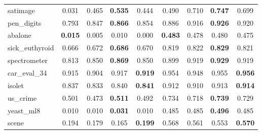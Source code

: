 \begin{figure}[ht]
\begin{tabular}{p{22mm}|*4{p{14mm}}|*4{p{14mm}}}
        satimage&\multicolumn{1}{c}{0.031}&\multicolumn{1}{c}{0.465}&\multicolumn{1}{c}{\textbf{0.535}}&\multicolumn{1}{c|}{0.444}&\multicolumn{1}{c}{0.490}&\multicolumn{1}{c}{0.710}&\multicolumn{1}{c}{\textbf{0.747}}&\multicolumn{1}{c}{0.699}\\
        pen\_digits&\multicolumn{1}{c}{0.793}&\multicolumn{1}{c}{0.847}&\multicolumn{1}{c}{\textbf{0.866}}&\multicolumn{1}{c|}{0.854}&\multicolumn{1}{c}{0.886}&\multicolumn{1}{c}{0.916}&\multicolumn{1}{c}{\textbf{0.926}}&\multicolumn{1}{c}{0.920}\\
        abalone&\multicolumn{1}{c}{\textbf{0.015}}&\multicolumn{1}{c}{0.005}&\multicolumn{1}{c}{0.010}&\multicolumn{1}{c|}{0.000}&\multicolumn{1}{c}{\textbf{0.483}}&\multicolumn{1}{c}{0.478}&\multicolumn{1}{c}{0.480}&\multicolumn{1}{c}{0.475}\\
        sick\_euthyroid&\multicolumn{1}{c}{0.666}&\multicolumn{1}{c}{0.672}&\multicolumn{1}{c}{\textbf{0.686}}&\multicolumn{1}{c|}{0.670}&\multicolumn{1}{c}{0.819}&\multicolumn{1}{c}{0.822}&\multicolumn{1}{c}{\textbf{0.829}}&\multicolumn{1}{c}{0.821}\\
        spectrometer&\multicolumn{1}{c}{0.813}&\multicolumn{1}{c}{0.850}&\multicolumn{1}{c}{\textbf{0.869}}&\multicolumn{1}{c|}{0.850}&\multicolumn{1}{c}{0.899}&\multicolumn{1}{c}{0.919}&\multicolumn{1}{c}{\textbf{0.929}}&\multicolumn{1}{c}{0.919}\\
        car\_eval\_34&\multicolumn{1}{c}{0.915}&\multicolumn{1}{c}{0.904}&\multicolumn{1}{c}{0.917}&\multicolumn{1}{c|}{\textbf{0.919}}&\multicolumn{1}{c}{0.954}&\multicolumn{1}{c}{0.948}&\multicolumn{1}{c}{0.955}&\multicolumn{1}{c}{\textbf{0.956}}\\
        isolet&\multicolumn{1}{c}{0.837}&\multicolumn{1}{c}{0.833}&\multicolumn{1}{c}{0.840}&\multicolumn{1}{c|}{\textbf{0.841}}&\multicolumn{1}{c}{0.912}&\multicolumn{1}{c}{0.910}&\multicolumn{1}{c}{0.913}&\multicolumn{1}{c}{\textbf{0.914}}\\
        us\_crime&\multicolumn{1}{c}{0.501}&\multicolumn{1}{c}{0.473}&\multicolumn{1}{c}{\textbf{0.511}}&\multicolumn{1}{c|}{0.492}&\multicolumn{1}{c}{0.734}&\multicolumn{1}{c}{0.718}&\multicolumn{1}{c}{\textbf{0.739}}&\multicolumn{1}{c}{0.729}\\
        yeast\_ml8&\multicolumn{1}{c}{0.010}&\multicolumn{1}{c}{0.010}&\multicolumn{1}{c}{\textbf{0.031}}&\multicolumn{1}{c|}{0.010}&\multicolumn{1}{c}{0.485}&\multicolumn{1}{c}{0.485}&\multicolumn{1}{c}{\textbf{0.496}}&\multicolumn{1}{c}{0.485}\\
        scene&\multicolumn{1}{c}{0.194}&\multicolumn{1}{c}{0.179}&\multicolumn{1}{c}{0.165}&\multicolumn{1}{c|}{\textbf{0.199}}&\multicolumn{1}{c}{0.568}&\multicolumn{1}{c}{0.561}&\multicolumn{1}{c}{0.553}&\multicolumn{1}{c}{\textbf{0.570}}\\

\end{tabular}
\end{figure}
